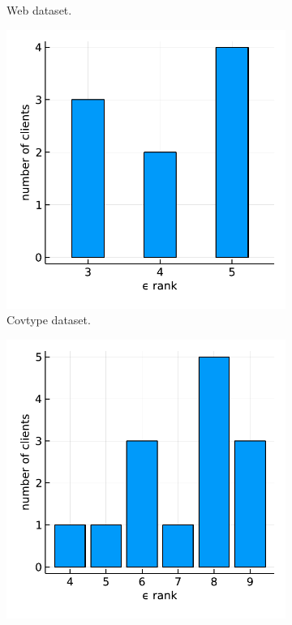 \begin{figure}[t]
\begin{subfigure}{.24\textwidth}
      \caption{Web dataset.}
      \label{fig:syn_embedding_matrix_web}
    \end{subfigure}
    \begin{subfigure}{.24\textwidth}
      \centering
      \includegraphics[width=\linewidth]{./figures/syn_embedding_matrix_covtype.pdf}
      \caption{Covtype dataset.}
      \label{fig:syn_embedding_matrix_covtype}
    \end{subfigure}
    \begin{subfigure}{.24\textwidth}
      \centering
      \includegraphics[width=\linewidth]{./figures/syn_embedding_matrix_rcv1.pdf}

\end{subfigure}
\end{figure}
